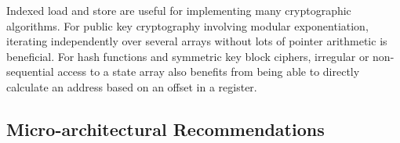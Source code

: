 Indexed load and store are useful for implementing many cryptographic
algorithms.
For public key cryptography involving modular exponentiation, iterating
independently over several arrays without lots of pointer arithmetic
is beneficial.
For hash functions and symmetric key block ciphers, irregular or
non-sequential access to a state array also benefits from
being able to directly calculate an address based on an offset in a
register.


\subsection{Micro-architectural Recommendations}



